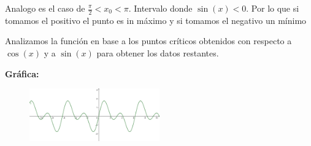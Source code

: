 \documentclass[12pt]{article}
\begin{document}
\begin{enumerate}[\hspace{9px} a)]
        Analogo es el caso de \(\frac{\pi}{2}<x_0<\pi\). Intervalo donde \(\sin(x)<0\). Por lo que si tomamos el positivo el punto es in m\'aximo y si tomamos el negativo un m\'inimo

        Analizamos la funci\'on en base a los puntos cr\'iticos obtenidos con respecto a \(\cos(x)\) y a \(\sin(x)\) para obtener los datos restantes.

    \textbf{Gr\'afica: }\medskip

    \begin{figure}[ht]
        \centering
        \includegraphics[width=0.5\textwidth]{11-c}
    \end{figure}

\end{enumerate}
\end{document}
